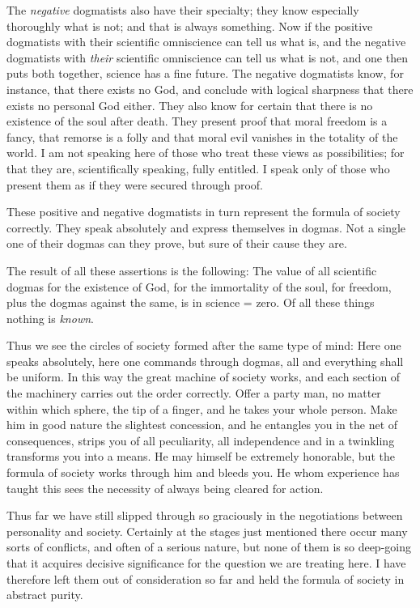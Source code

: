 \documentclass[12pt,a4paper,openany]{book}
\newcommand{\opage}[1]{\marginnote{\footnotesize\textit{[#1]}}}
\begin{document}
The \emph{negative} dogmatists also have their specialty; they know especially thoroughly
what is not; and that is always something. Now if the positive dogmatists with their
scientific omniscience can tell us what is, and the negative dogmatists with \emph{their}
scientific omniscience can tell us what is not, and one then puts both together, science
has a fine future. The negative dogmatists know, for instance, that there exists no God,
and conclude with logical sharpness that there exists no personal God either. They also know
\setcounter{footnote}{0}%
\opage{227}for certain that there is no existence of the soul after death. They present proof that moral
freedom is a fancy, that remorse is a folly and that moral evil vanishes in the totality
of the world. I am not speaking here of those who treat these views as possibilities; for
that they are, scientifically speaking, fully entitled. I speak only of those who present
them as if they were secured through proof.

These positive and negative dogmatists in turn represent the formula of society
correctly. They speak absolutely and express themselves in dogmas. Not a single one of
their dogmas can they prove, but sure of their cause they are.

The result of all these assertions is the following: The value of all scientific dogmas
for the existence of God, for the immortality of the soul, for freedom, plus the dogmas
against the same, is in science = zero. Of all these things nothing is \emph{known}.

Thus we see the circles of society formed after the same type of mind: Here one speaks
absolutely, here one commands through dogmas, all and everything shall be uniform. In
this way the great machine of society works, and each section of the machinery carries
out the order correctly. Offer a party man, no matter within which sphere, the tip of a
finger, and he takes your whole person. Make him in good nature the slightest
concession, and he entangles you in the net of consequences, strips you of all
peculiarity, all independence and in a twinkling transforms you into a means. He may
himself be extremely honorable, but the formula of society works through him and bleeds
you. He whom experience has taught this sees the necessity of always being cleared for
action.

Thus far we have still slipped through so graciously in the negotiations between
personality and society. Certainly at the stages just mentioned there occur many sorts of
conflicts, and often of a serious nature, but none of them
\setcounter{footnote}{0}%
\opage{228}is so deep-going that it acquires decisive significance for the question we are
treating here. I have therefore left them out of consideration so far and held the
formula of society in abstract purity.
\end{document}
